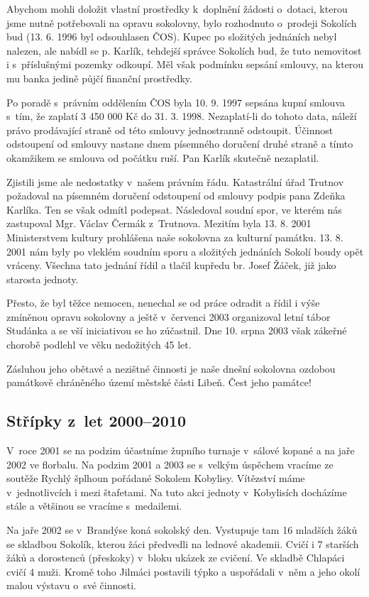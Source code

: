 \documentclass[a5paper, 11pt, twoside]{article}
\begin{document}
Abychom mohli doložit vlastní prostředky k~doplnění žádosti o~dotaci,
kterou jsme nutně potřebovali na opravu sokolovny, bylo rozhodnuto
o~prodeji Sokolích bud (13. 6. 1996 byl odsouhlasen ČOS). Kupec po
složitých jednáních nebyl nalezen, ale nabídl se p. Karlík, tehdejší
správce Sokolích bud, že tuto nemovitost i s~příslušnými pozemky
odkoupí. Měl však podmínku sepsání smlouvy, na kterou mu banka jedině
půjčí finanční prostředky.

Po poradě s~právním oddělením ČOS byla 10. 9. 1997 sepsána kupní smlouva
s~tím, že zaplatí 3 450 000 Kč do 31. 3. 1998. Nezaplatí-li do tohoto
data, náleží právo prodávající straně od této smlouvy jednostranně
odstoupit. Účinnost odstoupení od smlouvy nastane dnem písemného
doručení druhé straně a tímto okamžikem se smlouva od počátku ruší. Pan
Karlík skutečně nezaplatil.

Zjistili jsme ale nedostatky v~našem právním řádu. Katastrální úřad
Trutnov požadoval na písemném doručení odstoupení od smlouvy podpis pana
Zdeňka Karlíka. Ten se však odmítl podepsat. Následoval soudní spor, ve
kterém nás zastupoval Mgr. Václav Čermák z~Trutnova. Mezitím byla 13. 8.
2001 Ministerstvem kultury prohlášena naše sokolovna za kulturní
památku. 13. 8. 2001 nám byly po vleklém soudním sporu a složitých
jednáních Sokolí boudy opět vráceny. Všechna tato jednání řídil a tlačil
kupředu br. Josef Žáček, již jako starosta jednoty.

Přesto, že byl těžce nemocen, nenechal se od práce odradit a řídil i
výše zmíněnou opravu sokolovny a ještě v~červenci 2003 organizoval letní
tábor Studánka a se vší iniciativou se ho zúčastnil. Dne 10. srpna 2003
však zákeřné chorobě podlehl ve věku nedožitých 45 let.

Zásluhou jeho obětavé a nezištné činnosti je naše dnešní sokolovna
ozdobou památkově chráněného území městské části Libeň. Čest jeho
památce!

\subsection{Střípky z~let
2000--2010}

V~roce 2001 se na podzim účastníme župního turnaje v~sálové kopané a na
jaře 2002 ve florbalu. Na podzim 2001 a 2003 se s~velkým úspěchem
vracíme ze soutěže Rychlý šplhoun pořádané Sokolem Kobylisy. Vítězství
máme v~jednotlivcích i mezi štafetami. Na tuto akci jednoty v~Kobylisích
docházíme stále a většinou se vracíme s~medailemi.

Na jaře 2002 se v~Brandýse koná sokolský den. Vystupuje tam 16 mladších
žáků se skladbou Sokolík, kterou žáci předvedli na lednové akademii.
Cvičí i 7 starších žáků a dorostenců (přeskoky) v~bloku ukázek ze
cvičení. Ve skladbě Chlapáci cvičí 4 muži. Kromě toho Jilmáci postavili
týpko a uspořádali v~něm a jeho okolí malou výstavu o~své činnosti.
\end{document}
